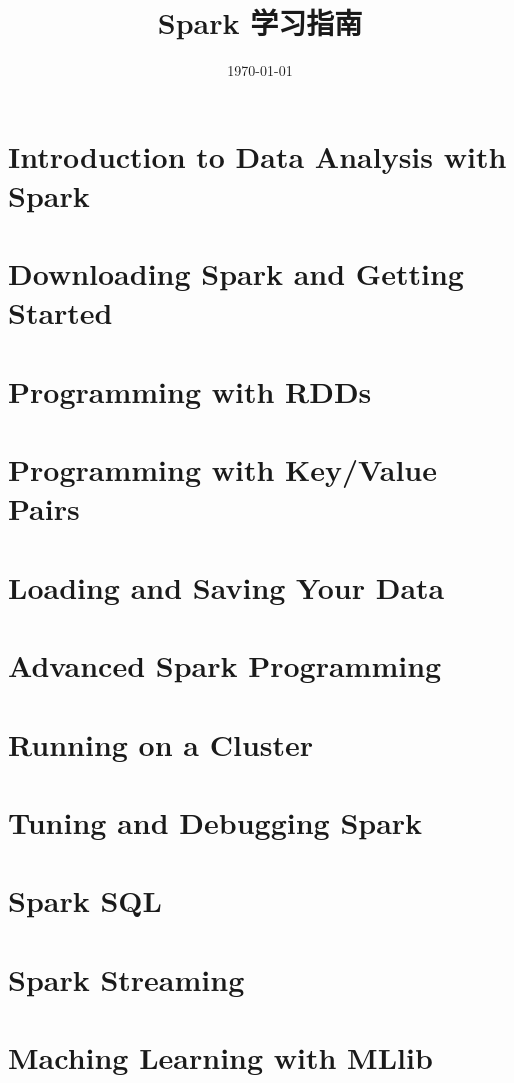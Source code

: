 \documentclass[b5paper,11pt,twoside]{ctexbook}
\title{Spark  学习指南  }
\author{}
\date{\today}
\begin{document}
\maketitle
\tableofcontents

\newpage
\chapter{Introduction to Data Analysis with Spark}

% 

\chapter{Downloading Spark and Getting Started}

\chapter{Programming with RDDs}

\chapter{Programming with Key/Value Pairs}

\chapter{Loading and Saving Your Data}

\chapter{Advanced Spark Programming}

\chapter{Running on a Cluster}

\chapter{Tuning and Debugging Spark}

\chapter{Spark SQL}

\chapter{Spark Streaming}

\chapter{Maching Learning with MLlib}

\printindex
\end{document}

